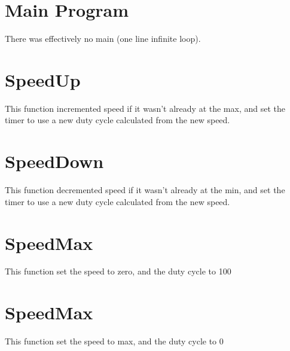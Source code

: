\documentclass[12pt,letterpaper]{article}
\begin{document}
\section{Main Program}
There was effectively no main (one line infinite loop).

\section{SpeedUp}
This function incremented speed if it wasn't already at the max, and set the timer to use a new duty cycle calculated from the new speed.

\section{SpeedDown}
This function decremented speed if it wasn't already at the min, and set the timer to use a new duty cycle calculated from the new speed.

\section{SpeedMax}
This function set the speed to zero, and the duty cycle to 100%

\section{SpeedMax}
This function set the speed to max, and the duty cycle to 0%
\end{document}

